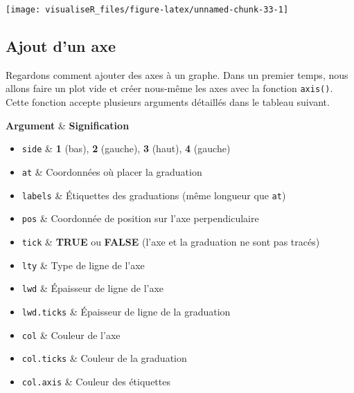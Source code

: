\documentclass[]{article}
\providecommand{\tightlist}{%
  \setlength{\itemsep}{0pt}\setlength{\parskip}{0pt}}
\begin{document}
\begin{center}\texttt{[image: visualiseR\_files/figure-latex/unnamed-chunk-33-1]} \end{center}

\hypertarget{ajout-dun-axe}{%
\subsection{Ajout d'un axe}\label{ajout-dun-axe}}

Regardons comment ajouter des axes à un graphe. Dans un premier temps, nous allons faire un plot vide et créer nous-même les axes avec la fonction \texttt{axis()}. Cette fonction accepte plusieurs arguments détaillés dans le tableau suivant.

\textbf{Argument} \& \textbf{Signification}

\begin{itemize}
\tightlist
\item
  \texttt{side} \& \textbf{1} (bas), \textbf{2} (gauche), \textbf{3} (haut), \textbf{4} (gauche)
\item
  \texttt{at} \& Coordonnées où placer la graduation
\item
  \texttt{labels} \& Étiquettes des graduations (même longueur que \texttt{at})
\item
  \texttt{pos} \& Coordonnée de position sur l'axe perpendiculaire
\item
  \texttt{tick} \& \textbf{TRUE} ou \textbf{FALSE} (l'axe et la graduation ne sont pas tracés)
\item
  \texttt{lty} \& Type de ligne de l'axe
\item
  \texttt{lwd} \& Épaisseur de ligne de l'axe
\item
  \texttt{lwd.ticks} \& Épaisseur de ligne de la graduation
\item
  \texttt{col} \& Couleur de l'axe
\item
  \texttt{col.ticks} \& Couleur de la graduation
\item
  \texttt{col.axis} \& Couleur des étiquettes
\end{itemize}
\end{document}
